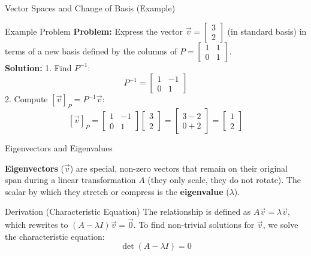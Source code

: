 \documentclass[10pt, aspectratio=169]{beamer}
\begin{document}
\begin{frame}{Vector Spaces and Change of Basis (Example)}
    \begin{exampleblock}{Example Problem}
        \textbf{Problem:} Express the vector $\vec{v} = \begin{bmatrix} 3 \\ 2 \end{bmatrix}$ (in standard basis) in terms of a new basis defined by the columns of $P = \begin{bmatrix} 1 & 1 \\ 0 & 1 \end{bmatrix}$. \\
        \vspace{0.5cm}
        \textbf{Solution:} 
        1. Find $P^{-1}$:
        $$P^{-1} = \begin{bmatrix} 1 & -1 \\ 0 & 1 \end{bmatrix}$$
        2. Compute $[\vec{v}]_P = P^{-1}\vec{v}$:
        $$[\vec{v}]_P = \begin{bmatrix} 1 & -1 \\ 0 & 1 \end{bmatrix} \begin{bmatrix} 3 \\ 2 \end{bmatrix} = \begin{bmatrix} 3 - 2 \\ 0 + 2 \end{bmatrix} = \begin{bmatrix} 1 \\ 2 \end{bmatrix}$$
    \end{exampleblock}
\end{frame}

\begin{frame}{Eigenvectors and Eigenvalues}
    \begin{definition}
        \textbf{Eigenvectors} ($\vec{v}$) are special, non-zero vectors that remain on their original span during a linear transformation $A$ (they only scale, they do not rotate). The scalar by which they stretch or compress is the \textbf{eigenvalue} ($\lambda$).
    \end{definition}

    \begin{block}{Derivation (Characteristic Equation)}
        The relationship is defined as $A \vec{v} = \lambda \vec{v}$, which rewrites to $(A - \lambda I)\vec{v} = \vec{0}$.
        To find non-trivial solutions for $\vec{v}$, we solve the characteristic equation:
        $$\det(A - \lambda I) = 0$$
    \end{block}
\end{frame}
\end{document}
